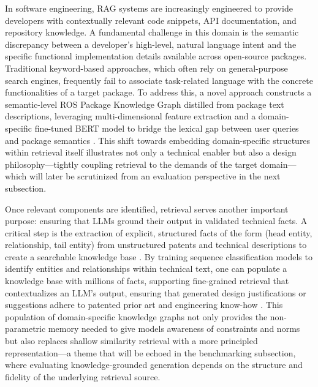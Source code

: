 \documentclass[11pt]{article}
\begin{document}
In software engineering, RAG systems are increasingly engineered to provide developers with contextually relevant code snippets, API documentation, and repository knowledge. A fundamental challenge in this domain is the semantic discrepancy between a developer's high-level, natural language intent and the specific functional implementation details available across open-source packages. Traditional keyword-based approaches, which often rely on general-purpose search engines, frequently fail to associate task-related language with the concrete functionalities of a target package. To address this, a novel approach constructs a semantic-level ROS Package Knowledge Graph distilled from package text descriptions, leveraging multi-dimensional feature extraction and a domain-specific fine-tuned BERT model to bridge the lexical gap between user queries and package semantics \cite{ref204}. This shift towards embedding domain-specific structures within retrieval itself illustrates not only a technical enabler but also a design philosophy---tightly coupling retrieval to the demands of the target domain---which will later be scrutinized from an evaluation perspective in the next subsection.

Once relevant components are identified, retrieval serves another important purpose: ensuring that LLMs ground their output in validated technical facts. A critical step is the extraction of explicit, structured facts of the form (head entity, relationship, tail entity) from unstructured patents and technical descriptions to create a searchable knowledge base \cite{ref205}. By training sequence classification models to identify entities and relationships within technical text, one can populate a knowledge base with millions of facts, supporting fine-grained retrieval that contextualizes an LLM's output, ensuring that generated design justifications or suggestions adhere to patented prior art and engineering know-how \cite{ref205}. This population of domain-specific knowledge graphs not only provides the non-parametric memory needed to give models awareness of constraints and norms but also replaces shallow similarity retrieval with a more principled representation---a theme that will be echoed in the benchmarking subsection, where evaluating knowledge-grounded generation depends on the structure and fidelity of the underlying retrieval source.
\end{document}

